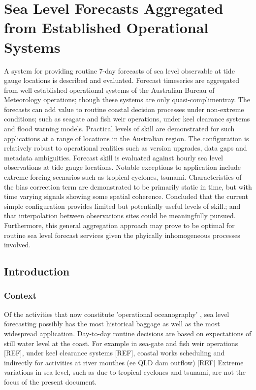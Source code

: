 \chapter{Sea Level Forecasts Aggregated from Established Operational Systems}

A system for providing routine 7-day forecasts of sea level observable at tide gauge locations is described and evaluated.
Forecast timeseries are aggregated from well established operational systems of the Australian Bureau of Meteorology operations; though these systems are only quasi-complimentray.
The forecasts can add value to routine coastal decision processes under non-extreme conditions; such as seagate and fish weir operations, under keel clearance systems and flood warning models. Practical levels of skill are demonstrated for such applications at a range of locations in the Australian region.
The configuration is relatively robust to operational realities such as version upgrades, data gaps and metadata ambiguities.
Forecast skill is evaluated against hourly sea level observations at tide gauge locations.  Notable exceptions to application include extreme forcing scenarios such as tropical cyclones, tsunami.
Characteristics of the bias correction term are demonstrated to be primarily static in time, but with time varying signals showing some spatial coherence.
Concluded that the current simple configuration provides limited but potentially useful levels of skill.; and that interpolation between observations sites could be meaningfully pursued. Furthermore, this general aggregation approach may prove to be optimal for routine sea level forecast services given the phyically inhomogeneous processes involved.
           
\section{Introduction}

\subsection{Context}

Of the activities that now constitute 'operational oceanography' \cite{Bell:2009uv}, sea level forecasting possibly has the most historical baggage as well as the most widespread application.
Day-to-day routine decisions are based on expectations of still water level \cite{Pugh:2014vf} at the coast.  
For example in sea-gate and fish weir operations [REF], under keel clearance systems [REF], coastal works scheduling and indirectly for activities at river mouthes (ee QLD dam outflow) [REF] 
Extreme variations in sea level, such as due to tropical cyclones and tsunami, are not the focus of the present document.



